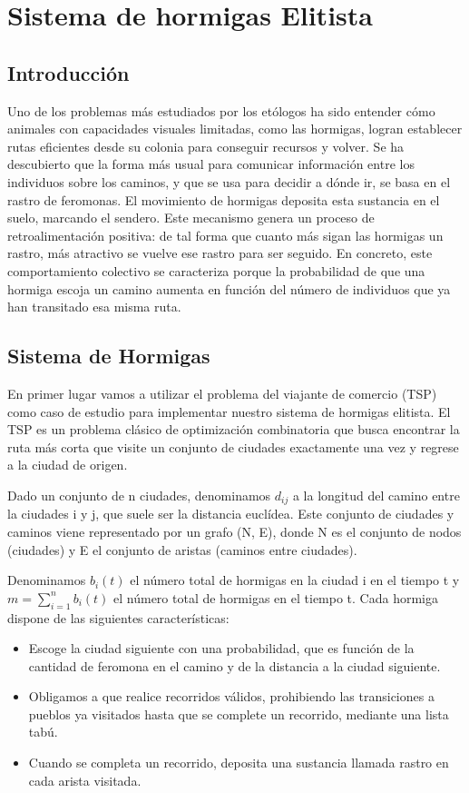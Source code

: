 \section{Sistema de hormigas Elitista}



\subsection{Introducción}

Uno de los problemas más estudiados por los etólogos ha sido entender cómo animales con capacidades visuales
limitadas, como las hormigas, logran establecer rutas eficientes desde su colonia para conseguir recursos y volver.
Se ha descubierto que la forma más usual para comunicar información entre los individuos sobre los caminos, 
y que se usa para decidir a dónde ir, se basa en el rastro de feromonas.
El movimiento de hormigas deposita esta sustancia en el suelo, marcando el sendero.
Este mecanismo genera un proceso de retroalimentación positiva: de tal forma que cuanto más sigan las hormigas 
un rastro, más atractivo se vuelve ese rastro para ser seguido. 
En concreto, este comportamiento colectivo se caracteriza porque la probabilidad de que una hormiga escoja 
un camino aumenta en función del número de individuos que ya han transitado esa misma ruta.

\subsection{Sistema de Hormigas}

En primer lugar vamos a utilizar el problema del viajante de comercio (TSP) como caso de estudio para
implementar nuestro sistema de hormigas elitista. 
El TSP es un problema clásico de optimización combinatoria que busca encontrar la ruta más corta 
que visite un conjunto de ciudades exactamente una vez y regrese a la ciudad de origen.

Dado un conjunto de n ciudades, denominamos $d_{ij}$ a la longitud del camino entre la ciudades i y j,
que suele ser la distancia euclídea. Este conjunto de ciudades y caminos viene representado por un grafo (N, E),
donde N es el conjunto de nodos (ciudades) y E el conjunto de aristas (caminos entre ciudades).

Denominamos $b_i(t)$ el número total de hormigas en la ciudad i en el tiempo t y $m = \sum_{i=1}^{n} b_i(t)$ 
el número total de hormigas en el tiempo t.
Cada hormiga dispone de las siguientes características:
\begin{itemize}
    \item Escoge la ciudad siguiente con una probabilidad, que es función de la cantidad de feromona en el camino y de la distancia a la ciudad siguiente.
    \item Obligamos a que realice recorridos válidos, prohibiendo las transiciones a pueblos ya visitados hasta que se complete un recorrido, mediante una lista tabú.
    \item Cuando se completa un recorrido, deposita una sustancia llamada rastro en cada arista visitada.
\end{itemize}

